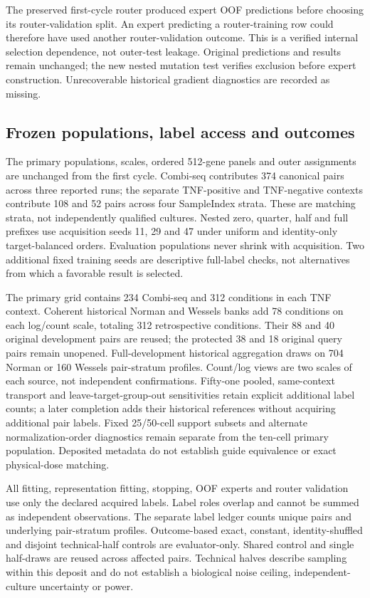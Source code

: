 The preserved first-cycle router produced expert OOF predictions before choosing its router-validation split. An expert predicting a router-training row could therefore have used another router-validation outcome. This is a verified internal selection dependence, not outer-test leakage. Original predictions and results remain unchanged; the new nested mutation test verifies exclusion before expert construction. Unrecoverable historical gradient diagnostics are recorded as missing.

\subsection{Frozen populations, label access and outcomes}
The primary populations, scales, ordered 512-gene panels and outer assignments are unchanged from the first cycle. Combi-seq contributes 374 canonical pairs across three reported runs; the separate TNF-positive and TNF-negative contexts contribute 108 and 52 pairs across four SampleIndex strata. These are matching strata, not independently qualified cultures. Nested zero, quarter, half and full prefixes use acquisition seeds 11, 29 and 47 under uniform and identity-only target-balanced orders. Evaluation populations never shrink with acquisition. Two additional fixed training seeds are descriptive full-label checks, not alternatives from which a favorable result is selected.

The primary grid contains 234 Combi-seq and 312 conditions in each TNF context. Coherent historical Norman and Wessels banks add 78 conditions on each log/count scale, totaling 312 retrospective conditions. Their 88 and 40 original development pairs are reused; the protected 38 and 18 original query pairs remain unopened. Full-development historical aggregation draws on 704 Norman or 160 Wessels pair-stratum profiles. Count/log views are two scales of each source, not independent confirmations. Fifty-one pooled, same-context transport and leave-target-group-out sensitivities retain explicit additional label counts; a later completion adds their historical references without acquiring additional pair labels. Fixed 25/50-cell support subsets and alternate normalization-order diagnostics remain separate from the ten-cell primary population. Deposited metadata do not establish guide equivalence or exact physical-dose matching.

All fitting, representation fitting, stopping, OOF experts and router validation use only the declared acquired labels. Label roles overlap and cannot be summed as independent observations. The separate label ledger counts unique pairs and underlying pair-stratum profiles. Outcome-based exact, constant, identity-shuffled and disjoint technical-half controls are evaluator-only. Shared control and single half-draws are reused across affected pairs. Technical halves describe sampling within this deposit and do not establish a biological noise ceiling, independent-culture uncertainty or power.

